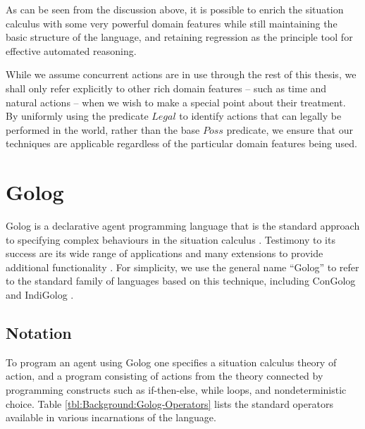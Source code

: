As can be seen from the discussion above, it is possible to enrich
the situation calculus with some very powerful domain features while
still maintaining the basic structure of the language, and retaining
regression as the principle tool for effective automated reasoning.

While we assume concurrent actions are in use through the rest of
this thesis, we shall only refer explicitly to other rich domain features
-- such as time and natural actions -- when we wish to make a special
point about their treatment. By uniformly using the predicate $Legal$
to identify actions that can legally be performed in the world, rather
than the base $Poss$ predicate, we ensure that our techniques are
applicable regardless of the particular domain features being used.


\section{Golog\label{sec:Background:Golog}}

Golog is a declarative agent programming language that is the standard
approach to specifying complex behaviours in the situation calculus
\citep{levesque97golog}. Testimony to its success are its wide range
of applications and many extensions to provide additional functionality
\citep{giacomo00congolog,giacomo99indigolog,Ferrein2005readylog}.
For simplicity, we use the general name {}``Golog'' to refer to
the standard family of languages based on this technique, including
ConGolog \citep{giacomo00congolog} and IndiGolog \citep{giacomo99indigolog}.


\subsection{Notation}

To program an agent using Golog one specifies a situation calculus
theory of action, and a program consisting of actions from the theory
connected by programming constructs such as if-then-else, while loops,
and nondeterministic choice. Table \ref{tbl:Background:Golog-Operators}
lists the standard operators available in various incarnations of
the language.

